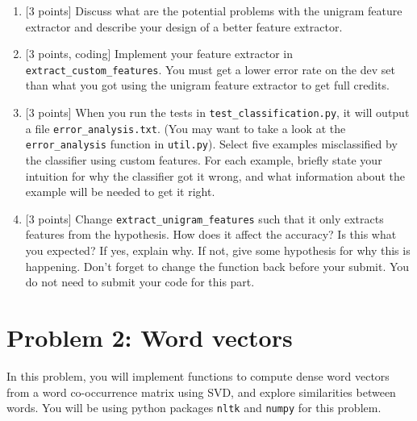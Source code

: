 \documentclass{article}
\theoremstyle{case}
\theoremstyle{definition}
\begin{document}
\begin{enumerate}
\begin{shaded}
        \end{shaded}

    \newpage
    \item {[3 points]} Discuss what are the potential problems with the unigram feature extractor
        and describe your design of a better feature extractor. 
        \begin{shaded}
        \end{shaded}

    \newpage
    \item {[3 points, coding]}
        Implement your feature extractor in \texttt{extract\_custom\_features}.
        You must get a lower error rate on the dev set than what you got using the unigram feature extractor to get full credits.
        \begin{shaded}
            
        \end{shaded}

    \newpage
\item {[3 points]} When you run the tests in \texttt{test\_classification.py}, it will output a file \texttt{error\_analysis.txt}. (You may want to take a look at the \texttt{error\_analysis} function in \texttt{util.py}).
    Select five examples misclassified by the classifier using custom features.
        For each example, briefly state your intuition for why the classifier got it wrong, and what information about the example will be needed to get it right.
        \begin{shaded}
        \end{shaded}

    \newpage
\item {[3 points]} Change \texttt{extract\_unigram\_features} such that it only extracts features from the hypothesis.
    How does it affect the accuracy? Is this what you expected? If yes, explain why. If not, give some hypothesis for why this is happening.
    Don't forget to change the function back before your submit. You do not need to submit your code for this part.
        \begin{shaded}
        \end{shaded}

\end{enumerate}

\newpage
\section*{Problem 2: Word vectors}
In this problem, you will implement functions to compute dense word vectors from a word co-occurrence matrix using SVD, and explore similarities between words.
You will be using python packages \texttt{nltk} and \texttt{numpy} for this problem.
\end{document}
